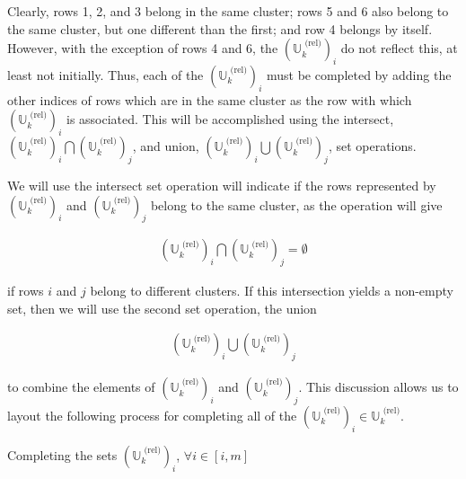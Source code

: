 \documentclass[../../ClusteringConnectionsMAIN.tex]{subfiles}
\begin{document}
\begin{flushleft}
\begin{large}
Clearly, rows 1, 2, and 3 belong in the same cluster; rows 5 and 6 also belong to the same cluster, but one different than the first; and row 4 belongs by itself.  However, with the exception of rows 4 and 6, the $\left( \mathbb{U}_k^\text{ (rel)} \right)_i$ do not reflect this, at least not initially.  Thus, each of the $\left( \mathbb{U}_k^\text{ (rel)} \right)_i$ must be completed by adding the other indices of rows which are in the same cluster as the row with which $\left( \mathbb{U}_k^\text{ (rel)} \right)_i$ is associated.  This will be accomplished using the intersect, $\left( \mathbb{U}_k^\text{ (rel)} \right)_i \bigcap \left( \mathbb{U}_k^\text{ (rel)} \right)_j$, and union, $\left( \mathbb{U}_k^\text{ (rel)} \right)_i \bigcup \left( \mathbb{U}_k^\text{ (rel)} \right)_j$, set operations.  \newline

We will use the intersect set operation will indicate if the rows represented by $\left( \mathbb{U}_k^\text{ (rel)} \right)_i$ and $\left( \mathbb{U}_k^\text{ (rel)} \right)_j$ belong to the same cluster, as the operation will give

\begin{align*}
\left( \mathbb{U}_k^\text{ (rel)} \right)_i \bigcap \left( \mathbb{U}_k^\text{ (rel)} \right)_j = \emptyset
\end{align*}

if rows $i$ and $j$ belong to different clusters.  If this intersection yields a non-empty set, then we will use the second set operation, the union 

\begin{align*}
\left( \mathbb{U}_k^\text{ (rel)} \right)_i \bigcup \left( \mathbb{U}_k^\text{ (rel)} \right)_j
\end{align*}

to combine the elements of $\left( \mathbb{U}_k^\text{ (rel)} \right)_i$ and $\left( \mathbb{U}_k^\text{ (rel)} \right)_j$.  This discussion allows us to layout the following process for completing all of the $\left( \mathbb{U}_k^\text{ (rel)} \right)_i \in \mathbb{U}_k^\text{ (rel)}$.  

\begin{algorithm}
\caption{Completing the sets $\left( \mathbb{U}_k^\text{ (rel)} \right)_i$, $\forall i \in \left[ i, m \right]$}
\end{algorithm}


\end{large}
\end{flushleft}
\end{document}
